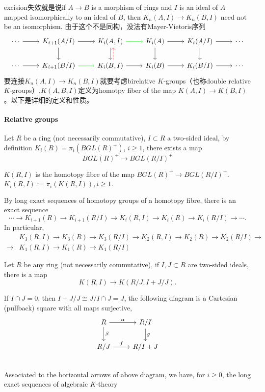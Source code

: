 excision失效就是说if $A \longrightarrow B$ is a morphism of rings and $I$ is an ideal of $A$ mapped isomorphically to an ideal of $B$,
then $K_n(A, I) \longrightarrow K_n(B, I)$ need not be an isomorphism. 由于这个不是同构，没法有Mayer-Vietoris序列
	\[\begin{tikzcd}
	\cdots \ar[r]&K_{i+1}(A/I) \ar[r] \ar[d]&	K_i(A,I) \ar[r,green] \ar[d]& K_i(A)\ar[r]\ar[d] & K_i(A/I)\ar[r] \ar[d] & \cdots\\
 \cdots \ar[r]&K_{i+1}(B/I) \ar[r,green] &	K_i(B,I) \ar[r] \ar[u, dashrightarrow, red, xshift=1ex] & K_i(B)\ar[r] & K_i(B/I)\ar[r] & \cdots
	\end{tikzcd}\]
要连接$K_n(A, I) \longrightarrow K_n(B, I)$就要考虑birelative $K$-groups（也称double relative $K$-groups）,$K(A,B,I)$定义为homotpy fiber of the map $K(A, I) \longrightarrow K(B, I)$。以下是详细的定义和性质。
\paragraph{Relative groups} %
\label{par:relative_groups}
Let $R$ be a ring (not necessarily commutative), $I\subset R$ a two-sided ideal, by definition $K_i(R)=\pi_i(BGL(R)^+)$, $i\geq 1$, there exists a map
\[BGL(R)^+ \longrightarrow BGL(R/I)^+\]
\begin{definition}
	$K(R,I)$ is the homotopy fibre of the map $BGL(R)^+ \longrightarrow BGL(R/I)^+$. $K_i(R,I):=\pi_i(K(R,I)), i\geq 1$.
\end{definition}

By long exact sequences of homotopy groups of a homotopy fibre, there is an exact sequence
\[\cdots \longrightarrow K_{i+1}(R)\longrightarrow K_{i+1}(R/I) \longrightarrow K_i(R,I)\longrightarrow K_i(R)\longrightarrow K_i(R/I)\longrightarrow \cdots.\]
In particular,
\begin{align*}
&K_3(R,I)\longrightarrow K_3(R)\longrightarrow K_3(R/I) \longrightarrow K_2(R,I)\longrightarrow K_2(R)\longrightarrow K_2(R/I)\longrightarrow\\
\longrightarrow & K_1(R,I)\longrightarrow K_1(R)\longrightarrow K_1(R/I)
\end{align*}

Let $R$ be any ring (not necessarily commutative), if $I,J\subset R$ are two-sided ideals, there is a map
\[K(R,I)\longrightarrow K(R/J,I+J/J).\]

If $I\cap J =0$, then $I+J/J\cong J/I\cap J=J$, the following diagram is a Cartesian (pullback) square with all maps surjective,
	\[\begin{tikzcd}
		R \ar[r,"\alpha"] \ar[d,"\beta"]& R/I\ar[d,"g"]\\
		R/J \ar[r,"f"] & R/I+J\\
	\end{tikzcd}\]
Associated to the horizontal arrows of above diagram, we have, for $i \geq 0$, the long exact sequences of algebraic $K$-theory 

